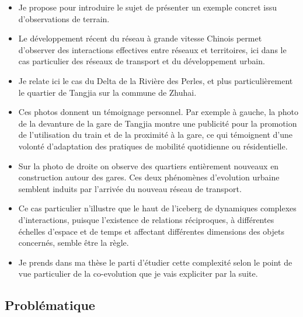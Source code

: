 \documentclass[12pt]{article}
\begin{document}
\begin{itemize}
	\item Je propose pour introduire le sujet de présenter un exemple concret issu d'observations de terrain.
	\item Le développement récent du réseau à grande vitesse Chinois permet d'observer des interactions effectives entre réseaux et territoires, ici dans le cas particulier des réseaux de transport et du développement urbain.
	\item Je relate ici le cas du Delta de la Rivière des Perles, et plus particulièrement le quartier de Tangjia sur la commune de Zhuhai.
	\item Ces photos donnent un témoignage personnel. Par exemple à gauche, la photo de la devanture de la gare de Tangjia montre une publicité pour la promotion de l'utilisation du train et de la proximité à la gare, ce qui témoignent d'une volonté d'adaptation des pratiques de mobilité quotidienne ou résidentielle.
	\item Sur la photo de droite on observe des quartiers entièrement nouveaux en construction autour des gares. Ces deux phénomènes d'evolution urbaine semblent induits par l'arrivée du nouveau réseau de transport.
	\item Ce cas particulier n'illustre que le haut de l'iceberg de dynamiques complexes d'interactions, puisque l'existence de relations réciproques, à différentes échelles d'espace et de temps et affectant différentes dimensions des objets concernés, semble être la règle.
	\item Je prends dans ma thèse le parti d'étudier cette complexité selon le point de vue particulier de la co-evolution que je vais expliciter par la suite.
\end{itemize}



\newpage


\subsection*{Problématique}
\end{document}
